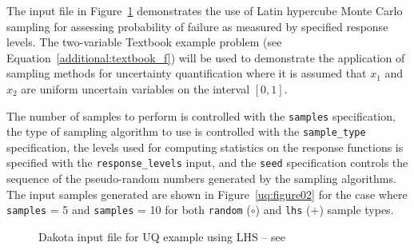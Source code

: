 The input file in Figure~\ref{uq:figure01} 
demonstrates the use of Latin hypercube Monte Carlo sampling for
assessing probability of failure as measured by specified response
levels.  The two-variable Textbook example problem (see
Equation~\ref{additional:textbook_f}) will be used to demonstrate
the application of sampling methods for uncertainty quantification
where it is assumed that $x_1$ and $x_2$ are uniform uncertain
variables on the interval $[0,1]$. 

The number of samples to
perform is controlled with the \texttt{samples} specification, the
type of sampling algorithm to use is controlled with the
\texttt{sample\_type} specification, the levels used for computing
statistics on the response functions is specified with the
\texttt{response\_levels} input, and the \texttt{seed} specification
controls the sequence of the pseudo-random numbers generated by the
sampling algorithms. The input samples generated are shown in
Figure~\ref{uq:figure02} for the case where \texttt{samples} = 5 and
\texttt{samples} = 10 for both \texttt{random} ($\circ$) and 
\texttt{lhs} ($+$) sample types.

\begin{figure}[htbp!]
  \centering \begin{bigbox} \begin{small}
   \end{small} \end{bigbox}
\caption{Dakota input file for UQ example using LHS --
see \protect{} }
\label{uq:figure01}
\end{figure}

